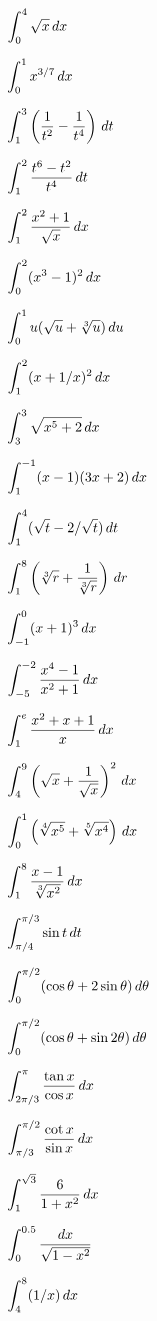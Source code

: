 \begin{multicols}{2}
\problem $\displaystyle \int^4_0 \sqrt{x} \,dx$ %

\problem $\displaystyle \int^1_0 x^{3/7} \,dx$ %

\problem $\displaystyle \int^3_1 \left(\frac{1}{ t^2}-\frac{1}{ t^4}\right) \,dt$ %

\problem $\displaystyle \int^2_1 \frac{t^6-t^2}{ t^4} \,dt$ %

\problem $\displaystyle \int^2_1 \frac{x^2+1}{ \sqrt{x}} \,dx$ %

\problem $\displaystyle \int^2_0 (x^3-1)^2 \,dx$ %

\problem $\DS \int^1_0 u(\sqrt{u}+{\root 3 \of u}) \,du$ %

\problem $\displaystyle \int^2_{1} (x+1/x)^2 \,dx$ %

\problem $\displaystyle \int^3_{3} \sqrt{x^5+2} \,dx$ %

\problem $\displaystyle \int^{-1}_1 (x-1)(3x+2) \,dx$ %

\problem $\displaystyle \int^{4}_1 (\sqrt{t}-2/\sqrt{t}) \,dt$ %

\problem $\DS \int^{8}_1 \left({\root 3\of r}+\frac{1}{ {\root 3 \of r}}\right) %
\,dr$

\problem $\displaystyle \int^{0}_{-1} (x+1)^3 \,dx$ %

\problem $\displaystyle \int^{-2}_{-5} \frac{x^4-1}{ x^2+1} \,dx$ %

\problem $\displaystyle \int^e_{1} \frac{x^2+x+1}{ x} \,dx$ %

\problem $\displaystyle \int^9_{4} \left(\sqrt{x}+\frac{1}{ \sqrt{x}}\right)^2 \,dx$ %

\problem $\DS \int^1_{0} \left({\root 4\of {x^5}}+{\root 5\of {x^4}}\right) %
\,dx$

\problem $\DS \int^8_{1} \frac{x-1}{ {\root 3\of {x^2}}} \,dx$ %

\problem $\displaystyle \int^{\pi/3}_{\pi/4} \sin t \,dt$ %

\problem $\displaystyle \int^{\pi/2}_0 (\cos \theta + 2\sin \theta) \,d\theta$ %

\problem $\displaystyle \int^{\pi/2}_0 (\cos \theta + \sin 2\theta) \,d\theta$ %

\problem $\displaystyle \int^{\pi}_{2\pi/3} \frac{\tan x}{\cos x} \,dx$ %

\problem $\displaystyle \int^{\pi/2}_{\pi/3} \frac{\cot x}{\sin x} \,dx$ %

\problem $\displaystyle \int^{\sqrt{3}}_{1} \frac{6}{ {1+x^2}} \,dx$ %

\problem $\displaystyle \int^{0.5}_{0} \frac{dx}{ \sqrt{1-x^2}}$ %

\problem $\displaystyle \int^{8}_{4} (1/x) \,dx$ %


\end{multicols}
